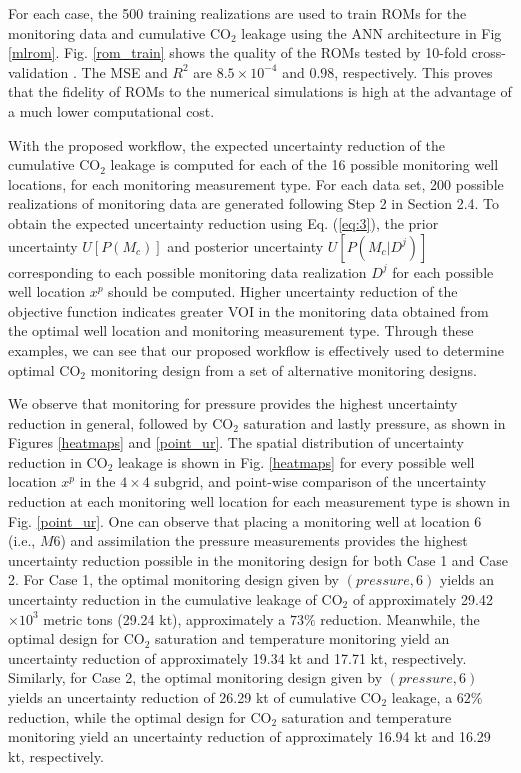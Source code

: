 \documentclass[a4paper,fleqn]{cas-sc}
\begin{document}
For each case, the 500 training realizations are used to train ROMs for the monitoring data and cumulative CO$_2$ leakage using the ANN architecture in Fig \ref{mlrom}. Fig. \ref{rom_train} shows the quality of the ROMs tested by 10-fold cross-validation \citep{Geisser1993, Xu2018249}. The MSE and $R^2$ are $8.5\times10^{-4}$ and $0.98$, respectively. This proves that the fidelity of ROMs to the numerical simulations is high at the advantage of a much lower computational cost.

With the proposed workflow, the expected uncertainty reduction of the cumulative CO$_2$ leakage is computed for each of the 16 possible monitoring well locations, for each monitoring measurement type. For each data set, 200 possible realizations of monitoring data are generated following Step 2 in Section 2.4. To obtain the expected uncertainty reduction using Eq. (\ref{eq:3}), the prior uncertainty $U[P(M_c)]$ and posterior uncertainty $U[P(M_c \vert D^j)]$ corresponding to each possible monitoring data realization $D^j$ for each possible well location $x^p$ should be computed. Higher uncertainty reduction of the objective function indicates greater VOI in the monitoring data obtained from the optimal well location and monitoring measurement type. Through these examples, we can see that our proposed workflow is effectively used to determine optimal CO$_2$ monitoring design from a set of alternative monitoring designs.

We observe that monitoring for pressure provides the highest uncertainty reduction in general, followed by CO$_2$ saturation and lastly pressure, as shown in Figures \ref{heatmaps} and \ref{point_ur}. The spatial distribution of uncertainty reduction in CO$_2$ leakage is shown in Fig. \ref{heatmaps} for every possible well location $x^p$ in the $4 \times 4$ subgrid, and point-wise comparison of the uncertainty reduction at each monitoring well location for each measurement type is shown in Fig. \ref{point_ur}. One can observe that placing a monitoring well at location 6 (i.e., $M6$) and assimilation the pressure measurements provides the highest uncertainty reduction possible in the monitoring design for both Case 1 and Case 2. For Case 1, the optimal monitoring design given by $(pressure, 6)$ yields an uncertainty reduction in the cumulative leakage of CO$_2$ of approximately 29.42$\times 10^3$ metric tons (29.24 kt), approximately a $73\%$ reduction. Meanwhile, the optimal design for CO$_2$ saturation and temperature monitoring yield an uncertainty reduction of approximately 19.34 kt and 17.71 kt, respectively. Similarly, for Case 2, the optimal monitoring design given by $(pressure, 6)$ yields an uncertainty reduction of 26.29 kt of cumulative CO$_2$ leakage, a $62\%$ reduction, while the optimal design for CO$_2$ saturation and temperature monitoring yield an uncertainty reduction of approximately 16.94 kt and 16.29 kt, respectively.
\end{document}

